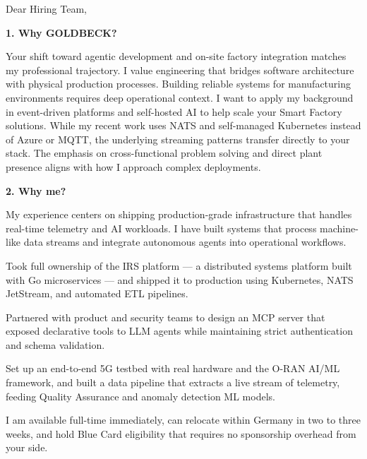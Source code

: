 \documentclass[11pt,a4paper]{coverletter}
\begin{document}

\opening{Dear Hiring Team,}

\vspace{8pt}\noindent\textbf{1. Why GOLDBECK?}\par\vspace{3pt}

Your shift toward agentic development and on-site factory integration matches my professional trajectory. I value engineering that bridges software architecture with physical production processes. Building reliable systems for manufacturing environments requires deep operational context. I want to apply my background in event-driven platforms and self-hosted AI to help scale your Smart Factory solutions. While my recent work uses NATS and self-managed Kubernetes instead of Azure or MQTT, the underlying streaming patterns transfer directly to your stack. The emphasis on cross-functional problem solving and direct plant presence aligns with how I approach complex deployments.

\vspace{8pt}\noindent\textbf{2. Why me?}\par\vspace{3pt}

My experience centers on shipping production-grade infrastructure that handles real-time telemetry and AI workloads. I have built systems that process machine-like data streams and integrate autonomous agents into operational workflows.

\bullets

  \item Took full ownership of the IRS platform — a distributed systems platform built with Go microservices — and shipped it to production using Kubernetes, NATS JetStream, and automated ETL pipelines.

  \item Partnered with product and security teams to design an MCP server that exposed declarative tools to LLM agents while maintaining strict authentication and schema validation.

  \item Set up an end-to-end 5G testbed with real hardware and the O-RAN AI/ML framework, and built a data pipeline that extracts a live stream of telemetry, feeding Quality Assurance and anomaly detection ML models.

\bulletsend

I am available full-time immediately, can relocate within Germany in two to three weeks, and hold Blue Card eligibility that requires no sponsorship overhead from your side.
\end{document}
